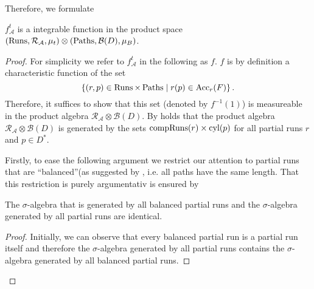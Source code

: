 Therefore, we formulate
\begin{proposition}
  \cite[Lemma 36]{RandAutoInfTrees}
  $f_{\mathcal{A}}^{t}$ is a integrable function in the product space
  $\left(\operatorname{Runs}, \mathcal{R}_{\mathcal{A}},\mu_{t}\right)\otimes
    \left(\operatorname{Paths}, \mathcal{B}(D), \mu_{B}\right)$.
\end{proposition}
\begin{proof}
  For simplicity we refer to $f_{\mathcal{A}}^{t}$ in the following as $f$.
  $f$ is by definition a characteristic function of the set
  \begin{equation*}
    \left\{\left(r,p\right)\in\operatorname{Runs}\times\operatorname{Paths}\mid r(p)\in\operatorname{Acc}_{r}(F)\right\}.
  \end{equation*}
  Therefore, it suffices to show that this set (denoted by $f^{-1}(1)$) is 
  measureable in the product algebra 
  $\mathcal{R}_{\mathcal{A}}\otimes\mathcal{B}(D)$. By 
  \cite[Theorem 22.1]{Bauer} holds that the product algebra
  $\mathcal{R}_{\mathcal{A}}\otimes\mathcal{B}(D)$ is generated by the
  sets $\operatorname{compRuns}(r)\times\operatorname{cyl}(p)$ for all partial runs $r$ and $p\in D^{*}$.

  Firstly, to ease the following argument we restrict our attention to
  partial runs that are \enquote{balanced}(as suggested by
  \cite[Remark 35]{RandAutoInfTrees}, i.e. all paths have the same length.
  That this restriction is purely argumentativ is ensured by
  \begin{lemma}
    The $\sigma$-algebra that is generated by all balanced partial runs and the 
    $\sigma$-algebra generated by all partial runs are identical.
    \label{lem:balancedruns}
  \end{lemma}
  \begin{proof}
    Initially, we can observe that every balanced partial run is a partial run
    itself and therefore the $\sigma$-algebra generated by all partial runs 
    contains the $\sigma$-algebra generated by all balanced partial runs.


\end{proof}
\end{proof}
